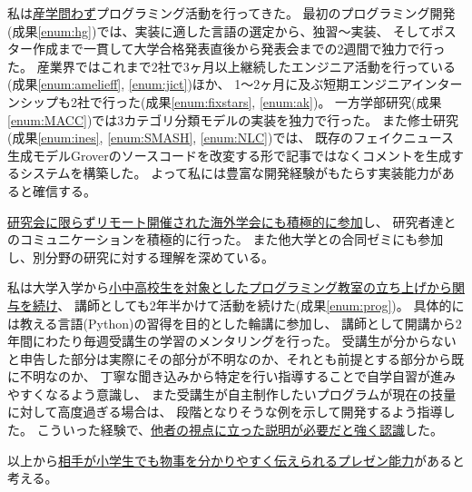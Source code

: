 私は\underline{産学問わず}プログラミング活動を行ってきた。
最初のプログラミング開発(成果\ref{enum:hg})では、実装に適した言語の選定から、独習〜実装、
そしてポスター作成まで一貫して大学合格発表直後から発表会までの2週間で独力で行った。
産業界ではこれまで2社で3ヶ月以上継続したエンジニア活動を行っている(成果\ref{enum:amelieff}, \ref{enum:jict})ほか、
1〜2ヶ月に及ぶ短期エンジニアインターンシップも2社で行った(成果\ref{enum:fixstars}, \ref{enum:ak})。
一方学部研究(成果\ref{enum:MACC})では3カテゴリ分類モデルの実装を独力で行った。
また修士研究(成果\ref{enum:ines}, \ref{enum:SMASH}, \ref{enum:NLC})では、
既存のフェイクニュース生成モデルGrover\cite{grover}のソースコードを改変する形で記事ではなくコメントを生成するシステムを構築した。
よって私には豊富な開発経験がもたらす実装能力があると確信する。

\underline{研究会に限らずリモート開催された海外学会にも積極的に参加}し、
研究者達とのコミュニケーションを積極的に行った。
また他大学との合同ゼミにも参加し、別分野の研究に対する理解を深めている。

私は大学入学から\underline{小中高校生を対象としたプログラミング教室の立ち上げから関与を続け}、
講師としても2年半かけて活動を続けた(成果\ref{enum:prog})。
具体的には教える言語(Python)の習得を目的とした輪講に参加し、
講師として開講から2年間にわたり毎週受講生の学習のメンタリングを行った。
受講生が分からないと申告した部分は実際にその部分が不明なのか、それとも前提とする部分から既に不明なのか、
丁寧な聞き込みから特定を行い指導することで自学自習が進みやすくなるよう意識し、
また受講生が自主制作したいプログラムが現在の技量に対して高度過ぎる場合は、
段階となりそうな例を示して開発するよう指導した。
こういった経験で、\underline{他者の視点に立った説明が必要だと強く認識}した。

以上から\underline{相手が小学生でも物事を分かりやすく伝えられるプレゼン能力}があると考える。

